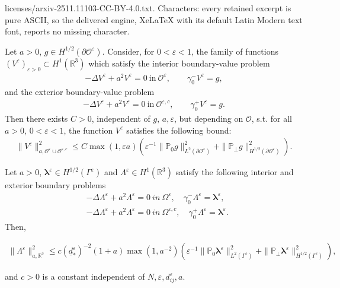 \documentclass[10pt,a4paper]{amsart}
\newcommand{\re}{\varepsilon}
\renewcommand{\O}{\mathcal{O}}
\renewcommand{\vec}{\boldsymbol}
\begin{document}
licenses/arxiv-2511.11103-CC-BY-4.0.txt. Characters: every retained excerpt is pure ASCII, so the delivered engine, XeLaTeX with its default Latin Modern text font, reports no missing character.
		\begin{lemma}
			\label{lemma:lifting}
			Let $a > 0 $, $g\in H^{1/2}(\partial\O^{\re})$. Consider, for $0<\re<1$, the family of functions  $(V^{\re})_{\re>0}\subset H^1(\mathbb{R}^3)$ which satisfy the interior boundary-value problem 
			\begin{align*}%
				- \Delta V^{\re} + a^2 V^{\re} = 0~\text{in}~\mathcal{O}^{\re}, \quad \quad \gamma^{-}_0 V^{\re} = g,
			\end{align*}
			and the exterior boundary-value problem 
			\begin{align*}%
				- \Delta V^{\re} + a^2 V^{\re} = 0~\text{in}~\mathcal{O}^{\re,c}, \quad \quad \gamma^{+}_0 V^{\re} = g.
			\end{align*}
			Then there exists $C>0$, independent of $g, \, a, \re$, but depending on $\O$, s.t. for all $a>0$,  $0<\re<1$, the function $V^{\re}$ satisfies the following bound:
			\begin{align*}%
				\| V^{\re} \|^2_{a,\O^{\re}\cup\O^{\re,c}} \leq C \max(1,\re a) \left(\re^{-1} \| \mathbb{P}_0g\|^2_{L^2(\partial \mathcal{O}^{\re})}+ \| \mathbb{P}_{\perp}g\|^2_{H^{1/2}(\partial \mathcal{O}^{\re})}\right).
			\end{align*}
		\end{lemma}

		\begin{lemma}
			\label{lifting_many_particles_proof}
			Let $a > 0$, $\vec{\lambda}^{\re} \in H^{1/2}(\Gamma^{\re})$ and $\Lambda^{\re} \in H^1(\mathbb{R}^3)$ satisfy the following interior and exterior boundary problems
			\begin{align*}%
				&-\Delta \Lambda^{\re} + a^2 \Lambda^{\re} = 0 ~in ~ \Omega^{\re}, \quad \gamma^-_0 \Lambda^{\re} = \vec{\lambda}^{\re}, \\ 
				&-\Delta \Lambda^{\re} + a^2 \Lambda^{\re} = 0 ~in ~ \Omega^{\re,c}, \quad \gamma^+_0 \Lambda^{\re} = \vec{\lambda}^{\re}.
			\end{align*} 
			Then, 
			
			\begin{align*}%
				\| \Lambda^{\re} \|^2_{a,\mathbb{R}^3} \leq c (\underline{d}^{\re}_*)^{-2} (1+a) \max(1, a^{-2}) \left(\re^{-1}  \| \mathbb{P}_0\vec{\lambda}^{\re} \|^2_{L^2(\Gamma^{\re})}+ \| \mathbb{P}_{\perp}\vec{\lambda}^{\re} \|^2_{H^{1/2}(\Gamma^{\re})}\right),
			\end{align*}
			
			and $c>0$ is a constant independent of $N, \re, d^{\re}_{ij}, a$. 
		\end{lemma}
\end{document}
